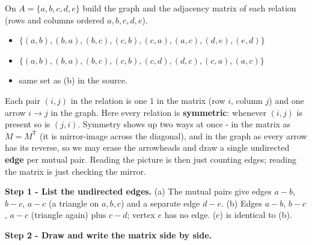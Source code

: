\documentclass[11pt,a4paper]{article}
\begin{document}
\begin{problembox}[2.1]
On $A=\{a,b,c,d,e\}$ build the graph and the adjacency matrix of each relation (rows and columns
ordered $a,b,c,d,e$).
\begin{itemize}[leftmargin=1.6em,nosep]
\item[a)] $\{(a,b),(b,a),(b,c),(c,b),(c,a),(a,c),(d,e),(e,d)\}$
\item[b)] $\{(a,b),(b,a),(b,c),(c,b),(c,d),(d,c),(c,a),(a,c)\}$
\item[c)] same set as (b) in the source.
\end{itemize}
\end{problembox}

\begin{ideabox}
Each pair $(i,j)$ in the relation is one $1$ in the matrix (row $i$, column $j$) and one arrow
$i\to j$ in the graph. Here every relation is \textbf{symmetric}: whenever $(i,j)$ is present so is
$(j,i)$. Symmetry shows up two ways at once - in the matrix as $M=M^{\mathsf T}$ (it is mirror-image
across the diagonal), and in the graph as \textquotedbl{}every arrow has its reverse\textquotedbl{},
so we may erase the arrowheads and draw a single undirected \textbf{edge} per mutual pair. Reading
the picture is then just counting edges; reading the matrix is just checking the mirror.
\end{ideabox}

\textbf{Step 1 - List the undirected edges.}
(a) The mutual pairs give edges $a\!-\!b$, $b\!-\!c$, $a\!-\!c$ (a triangle on $a,b,c$) and a
separate edge $d\!-\!e$. (b) Edges $a\!-\!b$, $b\!-\!c$, $a\!-\!c$ (triangle again) plus $c\!-\!d$;
vertex $e$ has no edge. (c) is identical to (b).

\textbf{Step 2 - Draw and write the matrix side by side.}

\begin{center}
\end{center}
\end{document}
